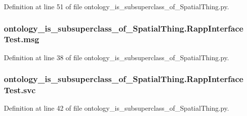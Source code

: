 Definition at line 51 of file ontology\-\_\-is\-\_\-subsuperclass\-\_\-of\-\_\-\-Spatial\-Thing.\-py.

\hypertarget{classontology__is__subsuperclass__of__SpatialThing_1_1RappInterfaceTest_a4ee6739b24c892e2938f585ad51b5184}{
\subsubsection[{msg}]{\setlength{\rightskip}{0pt plus 5cm}ontology\-\_\-is\-\_\-subsuperclass\-\_\-of\-\_\-\-Spatial\-Thing.\-Rapp\-Interface\-Test.\-msg}}\label{classontology__is__subsuperclass__of__SpatialThing_1_1RappInterfaceTest_a4ee6739b24c892e2938f585ad51b5184}


Definition at line 38 of file ontology\-\_\-is\-\_\-subsuperclass\-\_\-of\-\_\-\-Spatial\-Thing.\-py.

\hypertarget{classontology__is__subsuperclass__of__SpatialThing_1_1RappInterfaceTest_a3138eef0f79111c48ea53ac8ff24bb5a}{
\subsubsection[{svc}]{\setlength{\rightskip}{0pt plus 5cm}ontology\-\_\-is\-\_\-subsuperclass\-\_\-of\-\_\-\-Spatial\-Thing.\-Rapp\-Interface\-Test.\-svc}}\label{classontology__is__subsuperclass__of__SpatialThing_1_1RappInterfaceTest_a3138eef0f79111c48ea53ac8ff24bb5a}


Definition at line 42 of file ontology\-\_\-is\-\_\-subsuperclass\-\_\-of\-\_\-\-Spatial\-Thing.\-py.


